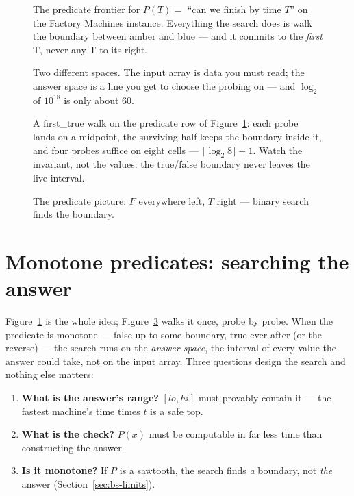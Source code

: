 \begin{figure}[ht]\centering

\caption{The predicate frontier for $P(T)=$ ``can we finish by time
$T$'' on the Factory Machines instance. Everything the search does is
walk the boundary between amber and blue --- and it commits to the
\emph{first} T, never any T to its right.}
\label{fig:frontier}
\end{figure}

\begin{figure}[ht]\centering

\caption{Two different spaces. The input array is data you must read;
the answer space is a line you get to choose the probing on ---
and $\log_2$ of $10^{18}$ is only about 60.}
\label{fig:answerspace}
\end{figure}

\begin{figure}[ht]\centering

\caption{A first\_true walk on the predicate row of
Figure~\ref{fig:frontier}: each probe lands on a midpoint, the
surviving half keeps the boundary inside it, and four probes suffice on
eight cells --- $\lceil\log_2 8\rceil + 1$. Watch the invariant, not
the values: the true/false boundary never leaves the live interval.}
\label{fig:bswalk}
\end{figure}


\begin{figure}[htbp]\centering

\caption{The predicate picture: $F$ everywhere left, $T$ right --- binary search finds the boundary.}
\label{fig:predicate}
\end{figure}

\section{Monotone predicates: searching the answer}\label{sec:bs-answer}

Figure~\ref{fig:frontier} is the whole idea; Figure~\ref{fig:bswalk} walks it once, probe by probe. When the predicate is
monotone --- false up to some boundary, true ever after (or the reverse)
--- the search runs on the \emph{answer space}, the interval of every
value the answer could take, not on the input array. Three questions
design the search and nothing else matters:

\begin{enumerate}
\item \textbf{What is the answer's range?} $[lo, hi]$ must provably
contain it --- the fastest machine's time times $t$ is a safe top.
\item \textbf{What is the check?} $P(x)$ must be computable in far less
time than constructing the answer.
\item \textbf{Is it monotone?} If $P$ is a sawtooth, the search finds
\emph{a} boundary, not \emph{the} answer (Section~\ref{sec:bs-limits}).
\end{enumerate}

